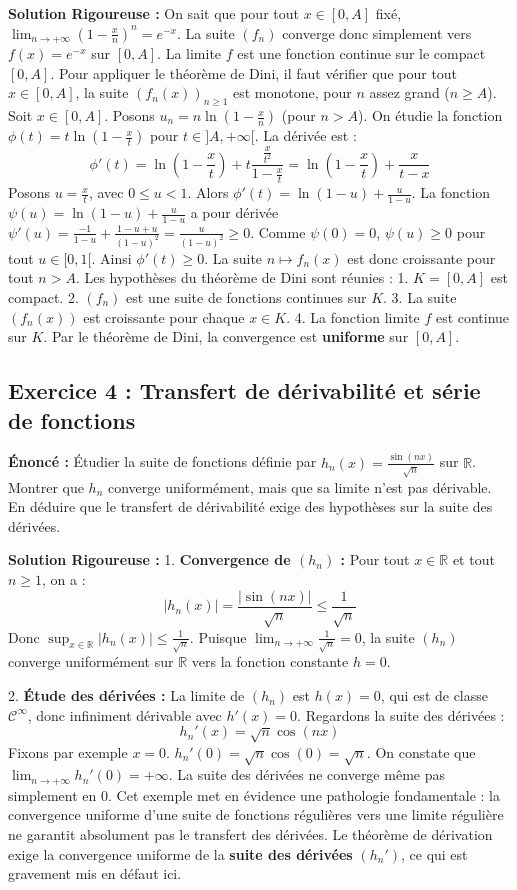 \documentclass[11pt,a4paper]{article}
\begin{document}
\textbf{Solution Rigoureuse :}
On sait que pour tout $x \in [0, A]$ fixé, $\lim_{n \to +\infty} \left(1 - \frac{x}{n}\right)^n = e^{-x}$.
La suite $(f_n)$ converge donc simplement vers $f(x) = e^{-x}$ sur $[0, A]$.
La limite $f$ est une fonction continue sur le compact $[0, A]$.
Pour appliquer le théorème de Dini, il faut vérifier que pour tout $x \in [0, A]$, la suite $(f_n(x))_{n \ge 1}$ est monotone, pour $n$ assez grand ($n \ge A$).
Soit $x \in [0, A]$. Posons $u_n = n \ln(1 - \frac{x}{n})$ (pour $n > A$).
On étudie la fonction $\phi(t) = t \ln(1 - \frac{x}{t})$ pour $t \in ]A, +\infty[$.
La dérivée est :
$$\phi'(t) = \ln(1 - \frac{x}{t}) + t \frac{\frac{x}{t^2}}{1 - \frac{x}{t}} = \ln(1 - \frac{x}{t}) + \frac{x}{t - x}$$
Posons $u = \frac{x}{t}$, avec $0 \le u < 1$. Alors $\phi'(t) = \ln(1-u) + \frac{u}{1-u}$.
La fonction $\psi(u) = \ln(1-u) + \frac{u}{1-u}$ a pour dérivée $\psi'(u) = \frac{-1}{1-u} + \frac{1-u+u}{(1-u)^2} = \frac{u}{(1-u)^2} \ge 0$.
Comme $\psi(0) = 0$, $\psi(u) \ge 0$ pour tout $u \in [0, 1[$.
Ainsi $\phi'(t) \ge 0$. La suite $n \mapsto f_n(x)$ est donc croissante pour tout $n > A$.
Les hypothèses du théorème de Dini sont réunies :
1. $K = [0, A]$ est compact.
2. $(f_n)$ est une suite de fonctions continues sur $K$.
3. La suite $(f_n(x))$ est croissante pour chaque $x \in K$.
4. La fonction limite $f$ est continue sur $K$.
Par le théorème de Dini, la convergence est \textbf{uniforme} sur $[0, A]$.


\subsection*{Exercice 4 : Transfert de dérivabilité et série de fonctions}
\textbf{Énoncé :}
Étudier la suite de fonctions définie par $h_n(x) = \frac{\sin(nx)}{\sqrt{n}}$ sur $\mathbb{R}$.
Montrer que $h_n$ converge uniformément, mais que sa limite n'est pas dérivable. En déduire que le transfert de dérivabilité exige des hypothèses sur la suite des dérivées.

\textbf{Solution Rigoureuse :}
1. \textbf{Convergence de $(h_n)$ :}
Pour tout $x \in \mathbb{R}$ et tout $n \ge 1$, on a :
$$|h_n(x)| = \frac{|\sin(nx)|}{\sqrt{n}} \le \frac{1}{\sqrt{n}}$$
Donc $\sup_{x \in \mathbb{R}} |h_n(x)| \le \frac{1}{\sqrt{n}}$.
Puisque $\lim_{n \to +\infty} \frac{1}{\sqrt{n}} = 0$, la suite $(h_n)$ converge uniformément sur $\mathbb{R}$ vers la fonction constante $h = 0$.

2. \textbf{Étude des dérivées :}
La limite de $(h_n)$ est $h(x) = 0$, qui est de classe $\mathcal{C}^\infty$, donc infiniment dérivable avec $h'(x) = 0$.
Regardons la suite des dérivées :
$$h_n'(x) = \sqrt{n} \cos(nx)$$
Fixons par exemple $x = 0$. $h_n'(0) = \sqrt{n} \cos(0) = \sqrt{n}$.
On constate que $\lim_{n \to +\infty} h_n'(0) = +\infty$.
La suite des dérivées ne converge même pas simplement en $0$.
Cet exemple met en évidence une pathologie fondamentale : la convergence uniforme d'une suite de fonctions régulières vers une limite régulière ne garantit absolument pas le transfert des dérivées. Le théorème de dérivation exige la convergence uniforme de la \textbf{suite des dérivées} $(h_n')$, ce qui est gravement mis en défaut ici.
\end{document}
